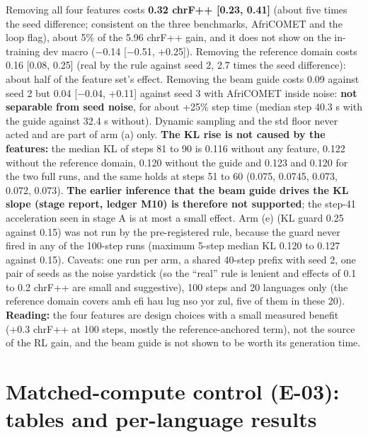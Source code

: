 Removing all four features costs \textbf{0.32 chrF++ [0.23, 0.41]} (about five times the seed difference; consistent on the three benchmarks, AfriCOMET and the loop flag), about 5\% of the 5.96 chrF++ gain, and it does not show on the in-training dev macro (\ensuremath{-}0.14 [\ensuremath{-}0.51, +0.25]). Removing the reference domain costs 0.16 [0.08, 0.25] (real by the rule against seed 2, 2.7 times the seed difference): about half of the feature set's effect. Removing the beam guide costs 0.09 against seed 2 but 0.04 [\ensuremath{-}0.04, +0.11] against seed 3 with AfriCOMET inside noise: \textbf{not separable from seed noise}, for about +25\% step time (median step 40.3 s with the guide against 32.4 s without). Dynamic sampling and the std floor never acted and are part of arm (a) only. \textbf{The KL rise is not caused by the features:} the median KL of steps 81 to 90 is 0.116 without any feature, 0.122 without the reference domain, 0.120 without the guide and 0.123 and 0.120 for the two full runs, and the same holds at steps 51 to 60 (0.075, 0.0745, 0.073, 0.072, 0.073). \textbf{The earlier inference that the beam guide drives the KL slope (stage report, ledger M10) is therefore not supported}; the step-41 acceleration seen in stage A is at most a small effect. Arm (e) (KL guard 0.25 against 0.15) was not run by the pre-registered rule, because the guard never fired in any of the 100-step runs (maximum 5-step median KL 0.120 to 0.127 against 0.15). Caveats: one run per arm, a shared 40-step prefix with seed 2, one pair of seeds as the noise yardstick (so the ``real'' rule is lenient and effects of 0.1 to 0.2 chrF++ are small and suggestive), 100 steps and 20 languages only (the reference domain covers amh efi hau lug nso yor zul, five of them in these 20). \textbf{Reading:} the four features are design choices with a small measured benefit (+0.3 chrF++ at 100 steps, mostly the reference-anchored term), not the source of the RL gain, and the beam guide is not shown to be worth its generation time. 





\section{Matched-compute control (E-03): tables and per-language results}\label{app:rlsft}


